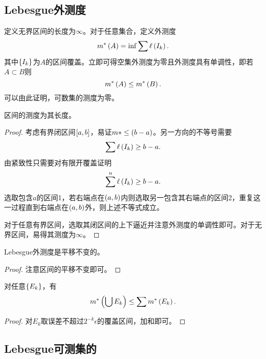 \documentclass{ctexrep}
\begin{document}
  \subsection{Lebesgue外测度}
  定义无界区间的长度为$\infty$。对于任意集合，定义外测度
  \[ m^*\left(A\right) = \inf\sum\ell\left(I_k\right). \]
  其中$\left\{I_k\right\}$为$A$的区间覆盖。立即可得空集外测度为零且外测度具有单调性，即若$A \subset B$则
  \[ m^*\left(A\right) \le m^*\left(B\right). \]
  可以由此证明，可数集的测度为零。
  \begin{proposition}
    区间的测度为其长度。
  \end{proposition}
  \begin{proof}
    考虑有界闭区间$\left[a,b\right]$，易证$m*\le\left(b-a\right)$。另一方向的不等号需要
    \[ \sum\ell\left(I_k\right) \ge b-a. \]
    由紧致性只需要对有限开覆盖证明
    \[ \sum^n \ell\left(I_k\right) \ge b-a. \]
    选取包含$a$的区间1，若右端点在$\left(a,b\right)$内则选取另一包含其右端点的区间2，重复这一过程直到右端点在$\left(a,b\right)$外，则上述不等式成立。
    \par
    对于任意有界区间，选取其闭区间的上下逼近并注意外测度的单调性即可。对于无界区间，易得其测度为$\infty$。
  \end{proof}
  \begin{proposition}
    Lebesgue外测度是平移不变的。
  \end{proposition}
  \begin{proof}
    注意区间的平移不变即可。
  \end{proof}
  \begin{proposition}
    对任意$\left\{E_k\right\}$，有
    \[ m^*\left(\bigcup E_k\right) \le \sum m^*\left(E_k\right). \]
  \end{proposition}
  \begin{proof}
    对$E_k$取误差不超过$2^{-k}\epsilon$的覆盖区间，加和即可。
  \end{proof}
  \subsection{Lebesgue可测集的\siga}
\end{document}
